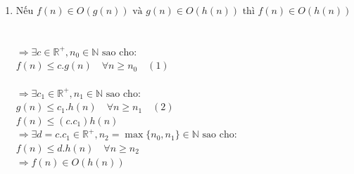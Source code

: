 \documentclass[12pt, letterpaper]{article}
\begin{document}
\begin{enumerate}
    \item $\text{Nếu } f(n) \in O(g(n)) \text{ và } g(n) \in O(h(n)) \text{ thì } f(n) \in O(h(n))$ \\ \\
     \\
    $\Rightarrow \exists c \in \mathbb{R^+}, n_0 \in \mathbb{N} \text{ sao cho:}$ \\
    $f(n) \leq c.g(n) \quad \forall n \geq n_0 \quad (1)$ \\

     \\
    $\Rightarrow \exists c_1 \in \mathbb{R^+}, n_1 \in \mathbb{N} \text{ sao cho:}$ \\
    $g(n) \leq c_1.h(n) \quad \forall n \geq n_1 \quad (2)$ \\

     $f(n) \leq (c.c_1)h(n)$\\
    $\Rightarrow \exists d = c.c_1 \in \mathbb{R^+},n_2 = \max\{n_0, n_1\} \in \mathbb{N} \text{ sao cho:}$ \\
    $f(n) \leq d.h(n) \quad \forall n \geq n_2$ \\
    $\Rightarrow f(n) \in O(h(n))$\\
     \\
\end{enumerate}
\end{document}
